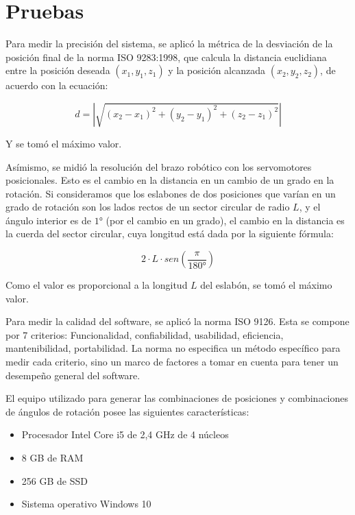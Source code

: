 \section{Pruebas}

Para medir la precisión del sistema, se aplicó la métrica de la desviación de la posición final de la norma ISO 9283:1998, que calcula la distancia euclidiana entre la posición deseada $(x_1, y_1, z_1)$ y la posición alcanzada $(x_2, y_2, z_2)$, de acuerdo con la ecuación:

\begin{equation}
	d = |\sqrt{(x_2 - x_1)^2 + (y_2 - y_1)^2 + (z_2 - z_1)^2}|
\end{equation}

Y se tomó el máximo valor.

Asímismo, se midió la resolución del brazo robótico con los servomotores posicionales. Esto es el cambio en la distancia en un cambio de un grado en la rotación. Si consideramos que los eslabones de dos posiciones que varían en un grado de rotación son los lados rectos de un sector circular de radio $L$, y el ángulo interior es de $1°$ (por el cambio en un grado), el cambio en la distancia es la cuerda del sector circular, cuya longitud está dada por la siguiente fórmula:

\begin{equation}
	2 \cdot L \cdot sen(\frac{\pi}{180°})
\end{equation}

Como el valor es proporcional a la longitud $L$ del eslabón, se tomó el máximo valor. 

Para medir la calidad del software, se aplicó la norma ISO 9126. Esta se compone por 7 criterios: Funcionalidad, confiabilidad, usabilidad, eficiencia, mantenibilidad, portabilidad. La norma no especifica un método específico para medir cada criterio, sino un marco de factores a tomar en cuenta para tener un desempeño general del software. 

El equipo utilizado para generar las combinaciones de posiciones y combinaciones de ángulos de rotación posee las siguientes características:

\begin{itemize}
	\item Procesador Intel Core i5 de 2,4 GHz de 4 núcleos
	\item 8 GB de RAM
	\item 256 GB de SSD
	\item Sistema operativo Windows 10
\end{itemize}